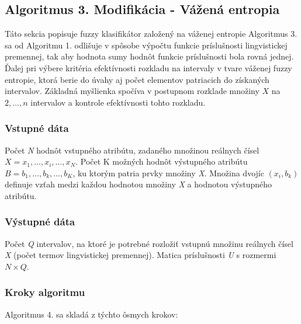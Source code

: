 \subsection{Algoritmus 3. Modifikácia  - Vážená entropia }
Táto sekcia popisuje fuzzy klasifikátor založený na váženej entropie
Algoritmus 3. sa od Algoritmu 1. odlišuje v spôsobe výpočtu funkcie príslušnosti lingvistickej premennej, tak aby hodnota sumy hodnôt funkcie príslušnosti bola rovná jednej. Ďalej pri výbere kritéria efektívnosti rozkladu na intervaly v tvare váženej fuzzy entropie, ktorá berie do úvahy aj počet elementov patriacich do získaných intervalov. Základná myšlienka spočíva v postupnom rozklade množiny $X$ na $2,\ldots, n$ intervalov a kontrole efektívnosti tohto rozkladu.  \cite{levashenkoProj}

\subsubsection{Vstupné dáta}
Počet \textit{N} hodnôt vstupného atribútu, zadaného množinou reálnych čísel $X={x_1, \ldots,x_i, \ldots, x_N}$. 
Počet K možných hodnôt výstupného atribútu $B={b_1, \ldots, b_k, \ldots, b_K}$, ku ktorým patria prvky množiny \textit{X}. Množina dvojíc $(x_i, b_k)$ definuje  vzťah medzi každou hodnotou množiny \textit{X} a hodnotou výstupného atribútu. \cite{levashenkoProj}

\subsubsection{Výstupné dáta}
Počet \textit{Q} intervalov, na ktoré je potrebné rozložiť vstupnú množinu reálnych čísel \textit{X} (počet termov lingvistickej premennej). Matica príslušnosti \textit{U} s rozmermi $N \times Q$. \cite{levashenkoProj}

\subsubsection{Kroky algoritmu}
Algoritmus 4. sa skladá z týchto ôsmych krokov:  



